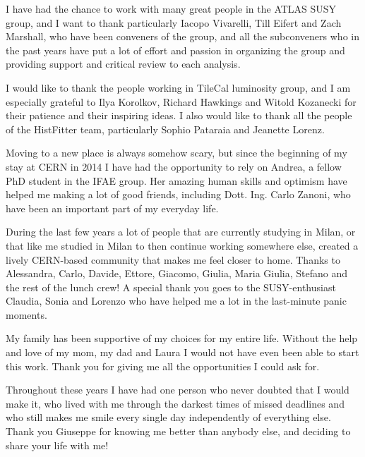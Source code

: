 \par\medskip
I have had the chance to work with many great people in the ATLAS SUSY group, and 
I want to thank particularly Iacopo Vivarelli, Till Eifert and Zach Marshall, who have been conveners of the group,
and all the subconveners who in the past years 
have put a lot of effort and passion in organizing the group and providing support and critical review 
to each analysis. 

\par\medskip 
I would like to thank the people working in TileCal luminosity group, 
and I am especially grateful to 
Ilya Korolkov, Richard Hawkings and Witold Kozanecki for their patience and their inspiring ideas. 
I also would like to thank all the people of the HistFitter team, 
particularly Sophio Pataraia and Jeanette Lorenz. 

\par\medskip 
Moving to a new place is always somehow scary, but since the beginning of my 
stay at CERN in 2014 I have had the opportunity to rely on Andrea, a fellow PhD student in the 
IFAE group. 
Her amazing human skills and optimism have helped me making a lot of good friends, including Dott. Ing. 
Carlo Zanoni, who have been an important part of my everyday life. 

\par\medskip

During the last few years a lot of people that are currently studying in Milan, or that like me 
studied in Milan to then continue working somewhere else, created a lively CERN-based community that 
makes me feel closer to home. 
Thanks to Alessandra, Carlo, Davide, Ettore, Giacomo, Giulia, Maria Giulia, Stefano and the rest of the 
lunch crew! A special thank you goes to the SUSY-enthusiast Claudia, Sonia and Lorenzo who have helped me a lot in the last-minute panic moments. 

\par\medskip 
My family has been supportive of my choices for my entire life. 
Without the help and love of my mom, my dad and Laura I would not have even been able to start this work. 
Thank you for giving me all the opportunities I could ask for. 

\par\medskip 
Throughout these years I have had one person who never doubted that I would make it, 
who lived with me through the darkest times of missed deadlines 
and who still makes me smile every single day independently 
of everything else. 
Thank you Giuseppe for knowing me better than anybody else, 
and deciding to share your life with me! 

